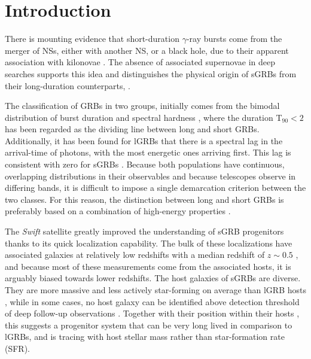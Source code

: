 \documentclass{aa}    %
\begin{document}

\maketitle

\section{Introduction}

There is mounting evidence that short-duration $\gamma$-ray bursts
come from the merger of NSs, either with another NS, or a black
hole, due to their apparent association with kilonovae \citep{Barnes2013a,
	Tanvir2013b, Yang2015, Jin2016, Rosswog2016}. The absence of associated
supernovae in deep searches \citep[e.g.][]{Hjorth2005a,Fox2005,Hjorth2005b, Kann2011}
supports this idea and distinguishes the physical origin of sGRBs from their
long-duration counterparts, \citep[albeit see also][]{Fynbo2006b, Valle2006, Gal-Yam2006}.

The classification of GRBs in two groups, initially comes from the bimodal
distribution of burst duration and spectral hardness \citep{Kouveliotou1993},
where the duration T$_{90} < 2$ has been regarded as the dividing line between long
and short GRBs. Additionally, it has been found for lGRBs that there is a
spectral lag in the arrival-time of photons, with the most energetic ones
arriving first. This lag is consistent with zero for sGRBs
\citep{Norris2006}. Because both populations have continuous, overlapping
distributions in their observables and because telescopes observe in differing
bands, it is difficult to impose a single demarcation criterion between the two
classes. For this reason, the distinction between long and short GRBs is
preferably based on a combination of high-energy properties \citep{Zhang2009,
	Bromberg2012a, Bromberg2013}.

The \textit{Swift} satellite \citep{Gehrels2004} greatly improved the
understanding of sGRB progenitors thanks to its quick localization capability.
The bulk of these localizations have associated galaxies at relatively low
redshifts with a median redshift of $z\sim0.5$ \citep{Berger2014}, and because
most of these measurements come from the associated hosts, it is arguably biased
towards lower redshifts. The host galaxies of sGRBs are diverse. They are more
massive and less actively star-forming on average than lGRB hosts
\citep{Fong2013b}, while in some cases, no host galaxy can be identified above
detection threshold of deep follow-up observations \citep{Berger2010a,
	Tunnicliffe2014}. Together with their position within their hosts
\citep{Fong2013a}, this suggests a progenitor system that can be very long lived
in comparison to lGRBs, and is tracing with host stellar mass rather than
star-formation rate (SFR).
\end{document}
